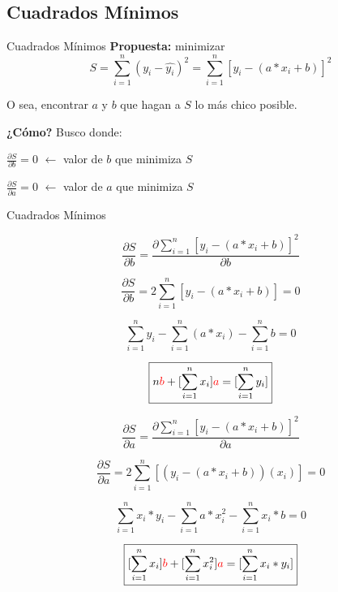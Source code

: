 \documentclass[xcolor=svgnames]{beamer} %
\theoremstyle{plain}
\renewcommand{\textbf}[1]{{\bfseries\textcolor{redUnq2}{#1}}}
\theoremstyle{definition}
\begin{document}
\subsection{Cuadrados Mínimos}

\begin{frame}{Cuadrados Mínimos}
  \textbf{Propuesta:} minimizar 
  $$ S = \sum_{i=1}^n (y_i - \hat{y_i})^2 = \sum_{i=1}^n  \left[y_i - (a* x_i +b)\right]^2 $$ \pause
  
  O sea, encontrar $a$ y $b$ que hagan a $S$ lo más chico posible. \pause
  
  \textbf{¿Cómo?}
  Busco donde:\vspace{15pt}
  
  $\frac{\partial S}{\partial b} = 0$ $\leftarrow$ valor de $b$ que minimiza $S$\vspace{15pt}
  
  $\frac{\partial S}{\partial a} = 0$ $\leftarrow$ valor de $a$ que minimiza $S$

\end{frame}


\begin{frame}{Cuadrados Mínimos}
\begin{minipage}{.45\linewidth}
{\footnotesize

$$ \frac{\partial S}{\partial b} = \frac{\partial \sum_{i=1}^n\left[y_i - (a* x_i +b)\right]^2}{\partial b} $$

$$ \frac{\partial S}{\partial b} =  2 \sum_{i=1}^n\left[y_i - (a* x_i +b)\right] = 0 $$

$$ \sum_{i=1}^n y_i - \sum_{i=1}^n (a*x_i) - \sum_{i=1}^n b = 0$$

$$\boxed{n {\color{red} b} + [\sum_{i=1}^n x_i] {\color{red} a} =  [\sum_{i=1}^n y_i] }$$
}
\end{minipage}\hspace{2pt} \vline\hspace{2pt} \begin{minipage}{.45\linewidth}
{\footnotesize

$$\frac{\partial S}{\partial a} = \frac{\partial \sum_{i=1}^n\left[y_i - (a* x_i +b)\right]^2}{\partial a} $$

$$\frac{\partial S}{\partial a} = 2\sum_{i=1}^n\left[(y_i - (a* x_i +b))(x_i) \right] = 0   $$

$$\sum_{i=1}^n x_i* y_i - \sum_{i=1}^n a*x_i^2- \sum_{i=1}^n x_i*b = 0 $$

$$\boxed{[\sum_{i=1}^n x_i]{\color{red}b} + [\sum_{i=1}^n x_i^2]{\color{red}a} = [\sum_{i=1}^n x_i*y_i]  } $$

}
\end{minipage} 
\end{frame}
\end{document}
